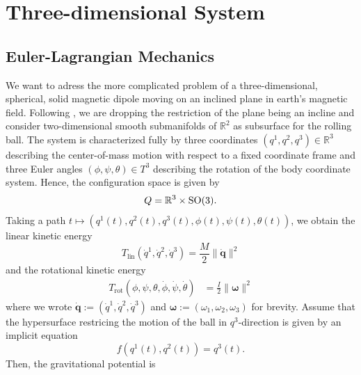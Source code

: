 \section{Three-dimensional System}
\subsection{Euler-Lagrangian Mechanics}
We want to adress the more complicated problem of a three-dimensional, spherical, solid magnetic dipole moving on an inclined plane in earth's magnetic field. Following \cite{rundquist}, we are dropping the restriction of the plane being an incline and consider two-dimensional smooth submanifolds of $\mathbb{R}^2$ as subsurface for the rolling ball. The system is characterized fully by three coordinates $(q^1,q^2,q^3)\in \mathbb{R}^3$ describing the center-of-mass motion with respect to a fixed coordinate frame and three Euler angles $(\phi, \psi , \theta) \in T^3$ describing the rotation of the body coordinate system. Hence, the configuration space is given by \[
Q = \mathbb{R}^3 \times \operatorname{SO}(3) 
.\] Taking a path $t \mapsto (q^1(t),q^2(t),q^3(t), \phi(t), \psi(t), \theta(t))$, we obtain the linear kinetic energy
\[
    T_\text{lin} (\dot{q}^1, \dot{q}^2, \dot{q}^3)=\frac{M}{2} \|\dot{\mathbf{q}}\|^2 
\] and the rotational kinetic energy 
\begin{align*}
    T_\text{rot}(\phi, \psi, \theta, \dot{\phi}, \dot{\psi}, \dot{\theta}) &= \frac{I}{2} \|\boldsymbol{\omega}\|^2
    \end{align*} where we wrote $\dot{\mathbf{q}}:=(\dot{q}^1,\dot{q}^2,\dot{q}^3)$ and $\boldsymbol{\omega}:=(\omega_1, \omega_2, \omega_3)$ for brevity. Assume that the hypersurface restricing the motion of the ball in $q^3$-direction is given by an implicit equation \[
f(q^1(t), q^2(t))=q^3(t)
.\] Then, the gravitational potential is
